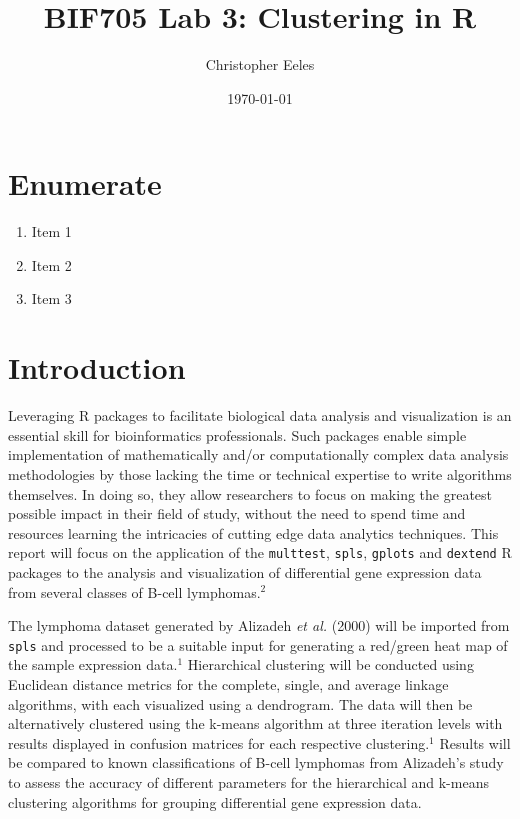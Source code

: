 \documentclass[11 pt,letterpaper,titlepage]{article} %
\title{\LARGE \bf
    BIF705 Lab 3: Clustering in R
    }
\author{Christopher Eeles}
\date{\small \today}
\begin{document}
\maketitle

\tableofcontents


\section{Enumerate}
    \begin{enumerate}
        \item Item 1
        \item Item 2
        \item Item 3
    \end{enumerate}

\section{Introduction}

    Leveraging R packages to facilitate biological data analysis and visualization is an essential skill for bioinformatics professionals.
    Such packages enable simple implementation of mathematically and/or computationally complex data analysis methodologies by those lacking the time or technical expertise to write algorithms themselves.
    In doing so, they allow researchers to focus on making the greatest possible impact in their field of study, without the need to spend time and resources learning the intricacies of cutting edge data analytics techniques.
    This report will focus on the application of the \texttt{multtest}, \texttt{spls}, \texttt{gplots} and \texttt{dextend} R packages to the analysis and visualization of differential gene expression data from several classes of B-cell lymphomas.$^2$
    

    The lymphoma dataset generated by Alizadeh \textit{et al.} (2000) will be imported from \texttt{spls} and processed to be a suitable input for generating a red/green heat map of the sample expression data.$^1$
    Hierarchical clustering will be conducted using Euclidean distance metrics for the complete, single, and average linkage algorithms, with each visualized using a dendrogram.
    The data will then be alternatively clustered using the k-means algorithm at three iteration levels with results displayed in confusion matrices for each respective clustering.$^1$
    Results will be compared to known classifications of B-cell lymphomas from Alizadeh's study to assess the accuracy of different parameters for the hierarchical and k-means clustering algorithms for grouping differential gene expression data.
\end{document}
